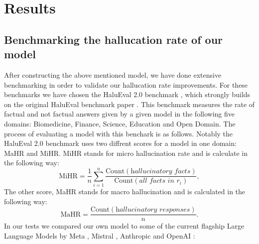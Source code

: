 \documentclass[10pt,leqno,twoside]{article}
\begin{document}
\section{Results}

\subsection{Benchmarking the hallucation rate of our model}


After constructing the above mentioned model, we have done extensive benchmarking in order to validate our hallucation rate improvements. For these benchmarks we have chosen the HaluEval 2.0 benchmark \cite{li2024dawn}, which strongly builds on the original HaluEval benchmark paper \cite{li2023halueval}. This benchmark measures the rate of factual and not factual answers given by a given model in the following five domains: Biomedicine, Finance, Science, Education and Open Domain.   The process of evaluating a model with this benchark is as follows. Notably the HaluEval 2.0 benchmark uses two diffrent scores for a model in one domain: MaHR and MiHR. MiHR stands for micro hallucination rate and is calculate in the following way: 
\[
\text{MiHR} = \frac{1}{n} \sum_{i=1}^{n} 
\frac{\text{Count}(\textit{hallucinatory facts})}
{\text{Count}(\textit{all facts in } r_i)},
\]
The other score, MaHR stands for macro hallucination and is calculated in the following way:
\[
\text{MaHR} = \frac{\text{Count}(\textit{hallucinatory responses})}{n}.
\]
 In our tests we compared our own model to some of the current flagship Large Language Models by Meta \cite{Llama}, Mistral \cite{Mistral}, Anthropic \cite{Anthropic} and OpenAI \cite{OpenAI}:
\end{document}
